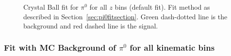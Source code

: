 \begin{figure}[H]
\label{fig:pi0zfit}
\caption[Crystal Ball fit for $\pi^0$ for all \(z\) bins]{Crystal Ball fit for $\pi^0$ for all \(z\) bins (default fit). Fit method as described in Section~\ref{sec:pi0fitsection}. Green dash-dotted line is the background and red dashed line is the signal.}
\end{figure}



\subsubsection{\texorpdfstring{Fit with MC Background of $\pi^0$ for all kinematic bins}{Fit with MC Background of pi0 for all kinematic bins}}
\label{sec:bkgfitpi0}

